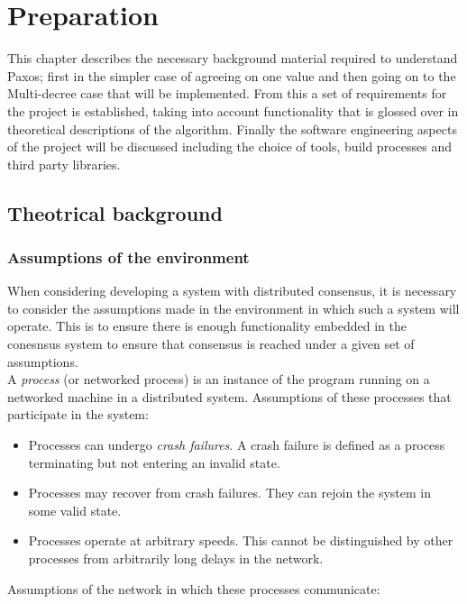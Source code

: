 \chapter{Preparation}

This chapter describes the necessary background material required to understand Paxos; first in the simpler case of agreeing on one value and then going on to the Multi-decree case that will be implemented. From this a set of requirements for the project is established, taking into account functionality that is glossed over in theoretical descriptions of the algorithm. Finally the software engineering aspects of the project will be discussed including the choice of tools, build processes and third party libraries.

\section{Theotrical background}

\subsection{Assumptions of the environment}
When considering developing a system with distributed consensus, it is necessary to consider the assumptions made in the environment in which such a system will operate. This is to ensure there is enough functionality embedded in the conesnsus system to ensure that consensus is reached under a given set of assumptions. \\

A \emph{process} (or networked process) is an instance of the program running on a networked machine in a distributed system. Assumptions of these processes that participate in the system:

\begin{itemize}
  \item Processes can undergo \emph{crash failures}. A crash failure is defined as a process terminating but not entering an invalid state.
  \item Processes may recover from crash failures. They can rejoin the system in some valid state. 
  \item Processes operate at arbitrary speeds. This cannot be distinguished by other processes from arbitrarily long delays in the network.
\end{itemize}

Assumptions of the network in which these processes communicate:

